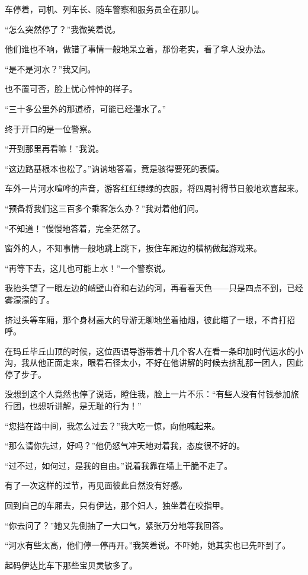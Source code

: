 \par 车停着，司机、列车长、随车警察和服务员全在那儿。
\par “怎么突然停了？”我微笑着说。
\par 他们谁也不响，做错了事情一般地呆立着，那份老实，看了拿人没办法。
\par “是不是河水？”我又问。
\par 也不置可否，脸上忧心忡忡的样子。
\par “三十多公里外的那道桥，可能已经漫水了。”
\par 终于开口的是一位警察。
\par “开到那里再看嘛！”我说。
\par “这边路基根本也松了。”讷讷地答着，竟是骇得要死的表情。
\par 车外一片河水喧哗的声音，游客红红绿绿的衣服，将四周衬得节日般地欢喜起来。
\par “预备将我们这三百多个乘客怎么办？”我对着他们问。
\par “不知道！”慢慢地答着，完全茫然了。
\par 窗外的人，不知事情一般地跳上跳下，扳住车厢边的横柄做起游戏来。
\par “再等下去，这儿也可能上水！”一个警察说。
\par 我抬头望了一眼左边的峭壁山脊和右边的河，再看看天色——只是四点不到，已经雾濛濛的了。
\par 挤过头等车厢，那个身材高大的导游无聊地坐着抽烟，彼此瞄了一眼，不肯打招呼。
\par 在玛丘毕丘山顶的时候，这位西语导游带着十几个客人在看一条印加时代运水的小沟，我从他正面走来，眼看石径太小，不好在他讲解的时候去挤乱那一团人，因此停了步子。
\par 没想到这个人竟然也停了说话，瞪住我，脸上一片不乐：“有些人没有付钱参加旅行团，也想听讲解，是无耻的行为！”
\par “您挡在路中间，我怎么过去？”我大吃一惊，向他喊起来。
\par “那么请你先过，好吗？”他仍怒气冲天地对着我，态度很不好的。
\par “过不过，如何过，是我的自由。”说着我靠在墙上干脆不走了。
\par 有了一次这样的过节，再见面彼此自然没有好感。
\par 回到自己的车厢去，只有伊达，那个妇人，独坐着在咬指甲。
\par “你去问了？”她又先倒抽了一大口气，紧张万分地等我回答。
\par “河水有些太高，他们停一停再开。”我笑着说。不吓她，她其实也已先吓到了。
\par 起码伊达比车下那些宝贝灵敏多了。
